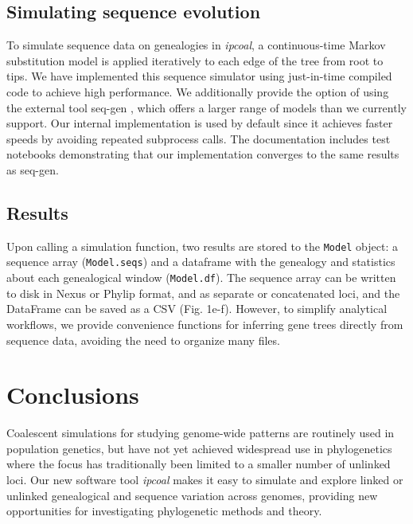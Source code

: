 \documentclass[11pt]{article}
\begin{document}
\subsection{Simulating sequence evolution}
To simulate sequence data on genealogies in \emph{ipcoal}, a continuous-time Markov substitution model is applied iteratively to each edge of the tree from root to tips. We have implemented this sequence simulator using just-in-time compiled code to achieve high performance. We additionally provide the option of using the external tool seq-gen \citep{rambaut_seqgen_1997}, which offers a larger range of models than we currently support. Our internal implementation is used by default since it achieves faster speeds by avoiding repeated subprocess calls. The documentation includes test notebooks demonstrating that our implementation converges to the same results as seq-gen.

\subsection{Results}
Upon calling a simulation function, two results are stored to the \texttt{Model} object: a sequence array (\texttt{Model.seqs}) and a dataframe with the genealogy and statistics about each genealogical window (\texttt{Model.df}). The sequence array can be written to disk in Nexus or Phylip format, and as separate or concatenated loci, and the DataFrame can be saved as a CSV (Fig. 1e-f). However, to simplify analytical workflows, we provide convenience functions for inferring gene trees directly from sequence data, avoiding the need to organize many files.

\section{Conclusions}
\label{sec:conclusions}
Coalescent simulations for studying genome-wide patterns are routinely used in population genetics, but have not yet achieved widespread use in phylogenetics where the focus has traditionally been limited to a smaller number of unlinked loci. Our new software tool \emph{ipcoal} makes it easy to simulate and explore linked or unlinked genealogical and sequence variation across genomes, providing new opportunities for investigating phylogenetic methods and theory.
\end{document}
